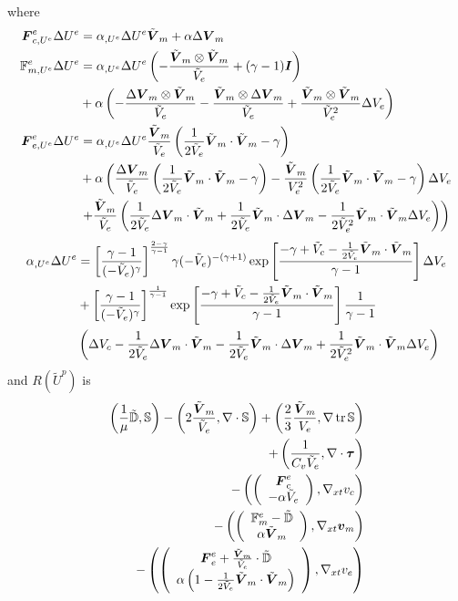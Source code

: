 \documentclass{article}
\begin{document}
where
\begin{align*}
\boldsymbol F^e_{c,U^e}\Delta U^e&=\alpha_{,U^e}\Delta U^e\tilde{\boldsymbol V}_m+\alpha\Delta\boldsymbol V_m\\
\mathbb{F}^e_{m,U^e}\Delta U^e&=
\alpha_{,U^e}\Delta U^e\left( -\frac{\tilde{\boldsymbol V}_m\otimes\tilde{\boldsymbol V}_m}{\tilde V_e}+(\gamma-1)\boldsymbol I \right)\\
&+\alpha\left( 
-\frac{\Delta\boldsymbol V_m\otimes\tilde{\boldsymbol V}_m}{\tilde V_e}
-\frac{\tilde{\boldsymbol V}_m\otimes\Delta\boldsymbol V_m}{\tilde V_e}
+\frac{\tilde{\boldsymbol V}_m\otimes\tilde{\boldsymbol V}_m}{\tilde V_e^2}\Delta V_e
 \right)\\
\boldsymbol F^e_{e,U^e}\Delta U^e&=
\alpha_{,U^e}\Delta U^e\frac{\tilde{\boldsymbol V}_m}{\tilde V_e}\left( \frac{1}{2\tilde V_e}\tilde{\boldsymbol V}_m\cdot\tilde{\boldsymbol V}_m-\gamma \right)\\
&+\alpha\left( 
\frac{\Delta\boldsymbol V_m}{\tilde V_e}\left( \frac{1}{2\tilde V_e}\tilde{\boldsymbol V}_m\cdot\tilde{\boldsymbol V}_m-\gamma \right)
-\frac{\tilde{\boldsymbol V}_m}{V_e^2}\left( \frac{1}{2\tilde V_e}\tilde{\boldsymbol V}_m\cdot\tilde{\boldsymbol V}_m-\gamma \right)\Delta V_e\right.\\
&\left.
+\frac{\tilde{\boldsymbol V}_m}{\tilde V_e}\left( 
\frac{1}{2\tilde V_e}\Delta\boldsymbol V_m\cdot\tilde{\boldsymbol V}_m
+\frac{1}{2\tilde V_e}\tilde{\boldsymbol V}_m\cdot\Delta\boldsymbol V_m
-\frac{1}{2\tilde V_e^2}\tilde{\boldsymbol V}_m\cdot\tilde{\boldsymbol V}_m\Delta V_e
 \right)
 \right)\\
\end{align*}
\begin{align*}
\alpha_{,U^e}\Delta U^e&=
\left[ \frac{\gamma-1}{(-\tilde V_e)^\gamma} \right]^{\frac{2-\gamma}{\gamma-1}}
\gamma(-\tilde V_e)^{-(\gamma+1)}
\exp\left[ \frac{-\gamma+\tilde V_c-\frac{1}{2\tilde V_e}\tilde{\boldsymbol V}_m\cdot\tilde{\boldsymbol V}_m}{\gamma-1} \right]
\Delta V_e\\
&+\left[ \frac{\gamma-1}{(-\tilde V_e)^\gamma} \right]^{\frac{1}{\gamma-1}}
\exp\left[ \frac{-\gamma+\tilde V_c-\frac{1}{2\tilde V_e}\tilde{\boldsymbol V}_m\cdot\tilde{\boldsymbol V}_m}{\gamma-1} \right]
\frac{1}{\gamma-1}\\
&\left( \Delta V_c
-\frac{1}{2\tilde V_e}\Delta\boldsymbol V_m\cdot\tilde{\boldsymbol V}_m
-\frac{1}{2\tilde V_e}\tilde{\boldsymbol V}_m\cdot\Delta\boldsymbol V_m
+\frac{1}{2\tilde V_e^2}\tilde{\boldsymbol V}_m\cdot\tilde{\boldsymbol V}_m\Delta V_e
 \right)
\end{align*}
and $R(\tilde U^p)$ is
\begin{align*}
	\left( \frac{1}{\mu}\tilde{\mathbb{D}},\mathbb{S} \right)-\left( 2\frac{\tilde{\boldsymbol V}_m}{\tilde V_e},\nabla\cdot\mathbb{S} \right)
	+\left( \frac{2}{3}\frac{\tilde{\boldsymbol V}_m}{V_e},\nabla\operatorname*{tr}{\mathbb{S}} \right)\\
	+\left( \frac{1}{C_v\tilde V_e},\nabla\cdot\boldsymbol\tau \right)\\
	-\left( \left( \begin{array}{c} \boldsymbol F^e_c\\ -\alpha\tilde V_e\\ \end{array} \right),\nabla_{xt} v_c \right)\\
	-\left( \left( \begin{array}{c} \mathbb{F}^e_m-\tilde{\mathbb{D}}\\ \alpha\tilde{\boldsymbol V}_m\\ \end{array} \right),\nabla_{xt}\boldsymbol v_m \right)\\
	-\left( \left( \begin{array}{c} \boldsymbol F^e_e+\frac{\tilde{\boldsymbol V}_m}{\tilde V_e}\cdot\tilde{\mathbb{D}}\\ \alpha\left( 1-\frac{1}{2\tilde V_e}\tilde{\boldsymbol V}_m\cdot\tilde{\boldsymbol V}_m \right)\\ \end{array} \right),\nabla_{xt} v_e \right)
\end{align*}
\end{document}
